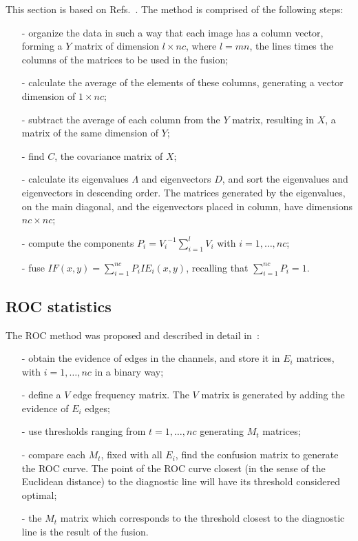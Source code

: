 \documentclass[conference]{IEEEtran}
\begin{document}
This section is based on Refs.~\cite{n_r,mit}.
The method is comprised of the following steps:
\begin{itemize}
\item[-] organize the data in such a way that each image has a column vector, forming a $Y$ matrix of dimension $l\times nc$, where $l=m n$, the lines times the columns of the matrices to be used in the fusion;
\item[-] calculate the average of the elements of these columns, generating a vector dimension of $1\times nc$;
\item[-] subtract the average of each column from the $Y$ matrix, resulting in $X$, a matrix of the same dimension of $Y$; 
\item[-] find $C$, the covariance matrix of $X$;
\item[-] calculate its eigenvalues $\Lambda$ and eigenvectors $D$, and sort the eigenvalues and eigenvectors in descending order. The matrices generated by the eigenvalues, on the main diagonal, and the eigenvectors placed in column, have dimensions $nc\times nc$;
\item[-] compute the components $P_i={V_i}^{-1}{\sum_{i=1}^l V_i}$ with $i=1,\dots,nc$;
\item[-] fuse $IF(x,y)=\sum_{i=1}^{nc}P_iIE_i(x,y)$, recalling that $\sum_{i=1}^{nc}P_i=1$.
\end{itemize}

\subsection{ROC statistics}

The ROC method was proposed and described in detail in~\cite{gs,fawcett}:
\begin{itemize}
\item[-] obtain the evidence of edges in the channels, and store it in $E_i$ matrices, with $i=1,\dots,nc$ in a binary way;
\item[-] define a $V$ edge frequency matrix. The $V$ matrix is generated by adding the evidence of $E_i$ edges;
\item[-] use thresholds ranging from $t=1,\dots,nc$ generating $M_t$ matrices;
\item[-] compare each $M_t$, fixed with all $E_i$, find the confusion matrix to generate the ROC curve. The point of the ROC curve closest (in the sense of the Euclidean distance) to the diagnostic line will have its threshold considered optimal;
\item[-] the $M_t$ matrix which corresponds to the threshold closest to the diagnostic line is the result of the fusion.
\end{itemize}
\end{document}
